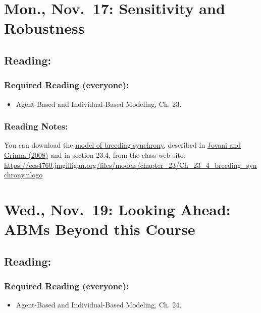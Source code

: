 \documentclass[
]{article}
\providecommand{\tightlist}{%
  \setlength{\itemsep}{0pt}\setlength{\parskip}{0pt}}
\begin{document}
\section{Mon., Nov.~17: Sensitivity and
Robustness}\label{mon.-nov.-17-sensitivity-and-robustness}

\subsection{Reading:}\label{reading-24}

\subsubsection{Required Reading
(everyone):}\label{required-reading-everyone-20}

\begin{itemize}
\tightlist
\item
  Agent-Based and Individual-Based Modeling, Ch. 23.
\end{itemize}

\subsubsection{Reading Notes:}\label{reading-notes-16}

You can download the
\href{/files/models/chapter_23/Ch_23_4_breeding_synchrony.nlogo}{model
of breeding synchrony}, described in
\href{/files/models/chapter_05/Jovani_Grimm_2008_Breeding.pdf}{Jovani
and Grimm (2008)} and in section 23.4, from the class web site:
\url{https://ees4760.jmgilligan.org/files/models/chapter_23/Ch_23_4_breeding_synchrony.nlogo}

\section{Wed., Nov.~19: Looking Ahead: ABMs Beyond this
Course}\label{wed.-nov.-19-looking-ahead-abms-beyond-this-course}

\subsection{Reading:}\label{reading-25}

\subsubsection{Required Reading
(everyone):}\label{required-reading-everyone-21}

\begin{itemize}
\tightlist
\item
  Agent-Based and Individual-Based Modeling, Ch. 24.
\end{itemize}
\end{document}
